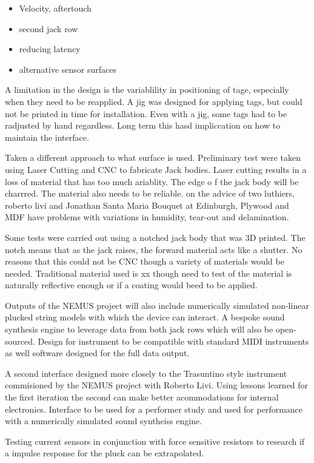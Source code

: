 \begin{itemize}
\tightlist
\item
  Velocity, aftertouch
\item
  second jack row
\item
  reducing latency
\item
  alternative sensor surfaces
\end{itemize}

A limitation in the design is the variablility in positioning of tage,
especially when they need to be reapplied. A jig was designed for
applying tags, but could not be printed in time for installation. Even
with a jig, some tags had to be radjusted by hand regardless. Long term
this hasd impliccation on how to maintain the interface.

Taken a different approach to what surface is used. Preliminary test
were taken using Laser Cutting and CNC to fabricate Jack bodies. Laser
cutting results in a loss of material that has too much ariablity. The
edge o f the jack body will be charrred. The material also needs to be
reliable. on the advice of two luthiers, roberto livi and Jonathan Santa
Maria Bouquet at Edinburgh, Plywood and MDF have problems with
variations in humidity, tear-out and delamination.

Some tests were carried out using a notched jack body that was 3D
printed. The notch means that as the jack raises, the forward material
acts like a shutter. No reasons that this could not be CNC though a
variety of materials would be needed. Traditional material used is xx
though need to test of the material is naturally reflective enough or if
a coating would beed to be applied.

Outputs of the NEMUS project will also include numerically simulated
non-linear plucked string models with which the device can interact. A
bespoke sound synthesis engine to leverage data from both jack rows
which will also be open-sourced. Design for instrument to be compatible
with standard MIDI instruments as well software designed for the full
data output.

A second interface designed more closely to the Trasuntino style
instrument commisioned by the NEMUS project with Roberto Livi. Using
lessons learned for the first iteration the second can make better
acommodations for internal electronics. Interface to be used for a
performer study and used for performance with a numerically simulated
sound syntheiss engine.

Testing current sensors in conjunction with force sensitive resistors to
research if a impulse response for the pluck can be extrapolated.

